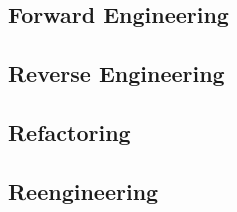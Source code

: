 \subsection{Forward Engineering}

\subsection{Reverse Engineering}

\subsection{Refactoring}

\subsection{Reengineering}


